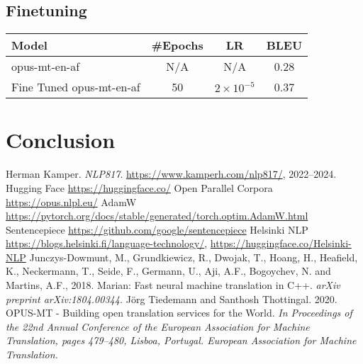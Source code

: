 	\subsection{Finetuning}
\begin{table}[H]
\begin{tabular}{lccc}
\toprule
Model         & \#Epochs & LR & BLEU\\
\midrule
opus-mt-en-af &   N/A       &  N/A  & 0.28  \\
Fine Tuned opus-mt-en-af &  50        & $2\times10^{-5}$    & 0.37  \\
\bottomrule
\end{tabular}
\end{table}
\section{Conclusion}


\begin{thebibliography}{1}

 Herman Kamper. \emph{NLP817}. \href{https://www.kamperh.com/nlp817/}{https://www.kamperh.com/nlp817/}, 2022--2024.
 Hugging Face \href{https://huggingface.co/}{https://huggingface.co/}
 Open Parallel Corpora \href{https://opus.nlpl.eu/}{https://opus.nlpl.eu/}
 AdamW \href{https://pytorch.org/docs/stable/generated/torch.optim.AdamW.html}{https://pytorch.org/docs/stable/generated/torch.optim.AdamW.html}
 Sentencepiece \href{https://github.com/google/sentencepiece}{https://github.com/google/sentencepiece}
 Helsinki NLP \href{https://blogs.helsinki.fi/language-technology/}{https://blogs.helsinki.fi/language-technology/}, \href{https://huggingface.co/Helsinki-NLP}{https://huggingface.co/Helsinki-NLP}
 Junczys-Dowmunt, M., Grundkiewicz, R., Dwojak, T., Hoang, H., Heafield, K., Neckermann, T., Seide, F., Germann, U., Aji, A.F., Bogoychev, N. and Martins, A.F., 2018. Marian: Fast neural machine translation in C++. \textit{arXiv preprint arXiv:1804.00344.}
 Jörg Tiedemann and Santhosh Thottingal. 2020. OPUS-MT - Building open translation services for the World. \textit{In Proceedings of the 22nd Annual Conference of the European Association for Machine Translation, pages 479–480, Lisboa, Portugal. European Association for Machine Translation.}
\end{thebibliography}